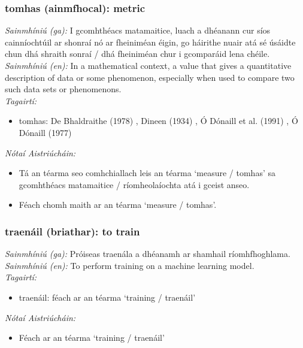 \documentclass{article}
\begin{document}
\subsubsection*{tomhas (ainmfhocal): metric}
 \noindent \textit{Sainmhíniú (ga):} I gcomhthéacs matamaitice, luach a dhéanann cur síos cainníochtúil ar shonraí nó ar fheiniméan éigin, go háirithe nuair atá sé úsáidte chun dhá shraith sonraí / dhá fheiniméan chur i gcomparáid lena chéile.
\\
 \noindent \textit{Sainmhíniú (en):} In a mathematical context, a value that gives a quantitative description of data or some phenomenon, especially when used to compare two such data sets or phenomenons.
\\
 \noindent \textit{Tagairtí:}
\begin{itemize}
	\item tomhas: De Bhaldraithe (1978) \cite{de-bhaldraithe}, Dineen (1934) \cite{dineen}, Ó Dónaill et al. (1991) \cite{focloir-beag}, Ó Dónaill (1977) \cite{odonaill}
\end{itemize}

 \noindent \textit{Nótaí Aistriúcháin:}
\begin{itemize}
	\item Tá an téarma seo comhchiallach leis an téarma `measure / tomhas' sa gcomhthéacs matamaitice / ríomheolaíochta atá i gceist anseo.
	\item Féach chomh maith ar an téarma `measure / tomhas'.
\end{itemize}


\subsubsection*{traenáil (briathar): to train}
 \noindent \textit{Sainmhíniú (ga):} Próiseas traenála a dhéanamh ar shamhail ríomhfhoghlama.
\\
 \noindent \textit{Sainmhíniú (en):} To perform training on a machine learning model.
\\
 \noindent \textit{Tagairtí:}
\begin{itemize}
	\item traenáil: féach ar an téarma `training / traenáil'
\end{itemize}

 \noindent \textit{Nótaí Aistriúcháin:}
\begin{itemize}
	\item Féach ar an téarma `training / traenáil'
\end{itemize}
\end{document}
